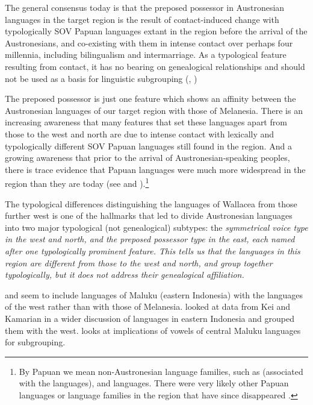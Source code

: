 The general consensus today is that the preposed possessor in Austronesian languages
in the target region is the result of contact-induced change with typologically SOV
Papuan languages extant in the region before the arrival of the Austronesians,
and co-existing with them in intense contact over perhaps four millennia,
including bilingualism and intermarriage.
As a typological feature resulting from contact,
it has no bearing on genealogical relationships
and should not be used as a basis for linguistic subgrouping
(\citealp[290--292]{Grimes1991c}, \citealp{Grimes2000a,GrimesCIP,DonohueGrimes2008,
KlamerReesinkVanStaden2008,Schapper2015,Klamer2019,Schapper2024})

The preposed possessor is just one feature which shows an affinity between
the Austronesian languages of our target region with those of Melanesia.
There is an increasing awareness that many features that set these languages apart from those to the west
and north are due to intense contact with lexically
and typologically different SOV Papuan languages still found in the region.
And a growing awareness that prior to the arrival of Austronesian-speaking peoples,
there is trace evidence that Papuan languages were much more widespread in the region than they are today
(see  and ).\footnote{
		By Papuan we mean non-Austronesian language families,
		such as  (associated with the  languages),
		and  languages.
		There were very likely other Papuan languages or language families
		in the region that have since disappeared \citep{Donohue2007}.}

The typological differences distinguishing the languages of Wallacea
from those further west is one of the hallmarks that led
\citet{Himmelmann2005} to divide Austronesian languages into
two major typological (not genealogical) subtypes:
the \it{symmetrical voice} type in the west and north,
and the \it{preposed possessor} type in the east,
each named after one typologically prominent feature.
This tells us that the languages in this region are different from those to the west
and north, and group together typologically,
but it does not address their genealogical affiliation.

\citet{Dyen1965,Haudricourt1965} and \citet{Dahl1976}
seem to include languages of Maluku (eastern Indonesia)
with the languages of the west rather than with those of Melanesia.
\citet{Dyen1978a} looked at data from Kei
and Kamarian in a wider discussion of languages in eastern Indonesia
and grouped them with the west.
\citet{Dyen1978b} looks at implications of vowels of
central Maluku languages for  subgrouping.

